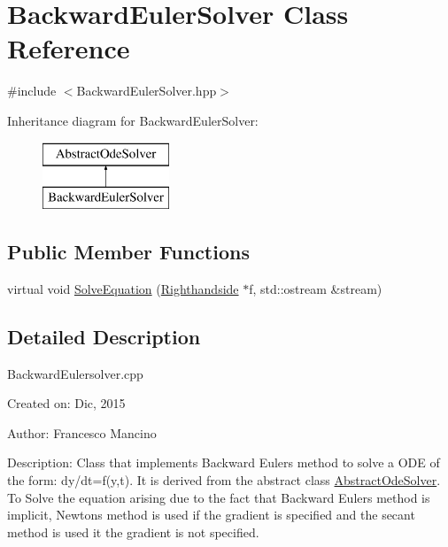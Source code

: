 \hypertarget{class_backward_euler_solver}{}\section{Backward\+Euler\+Solver Class Reference}
\label{class_backward_euler_solver}


{\ttfamily \#include $<$Backward\+Euler\+Solver.\+hpp$>$}

Inheritance diagram for Backward\+Euler\+Solver\+:\begin{figure}[H]
\begin{center}
\leavevmode
\includegraphics[height=2.000000cm]{class_backward_euler_solver}
\end{center}
\end{figure}
\subsection*{Public Member Functions}
\begin{DoxyCompactItemize}
\item 
virtual void \hyperlink{class_backward_euler_solver_ad800861c582a920b98288d65e0f68d45}{Solve\+Equation} (\hyperlink{class_righthandside}{Righthandside} $\ast$f, std\+::ostream \&stream)
\end{DoxyCompactItemize}


\subsection{Detailed Description}
Backward\+Eulersolver.\+cpp

Created on\+: Dic, 2015 \begin{DoxyVerb}Author: Francesco Mancino
\end{DoxyVerb}


Description\+: Class that implements Backward Eulers method to solve a O\+D\+E of the form\+: dy/dt=f(y,t). It is derived from the abstract class \hyperlink{class_abstract_ode_solver}{Abstract\+Ode\+Solver}. To Solve the equation arising due to the fact that Backward Eulers method is implicit, Newtons method is used if the gradient is specified and the secant method is used it the gradient is not specified. 

